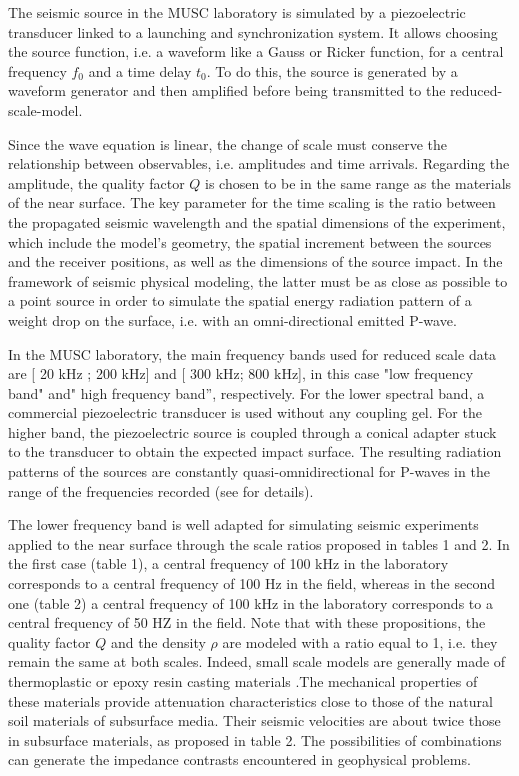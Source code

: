 \documentclass[manuscript,revised]{geophysics}
\begin{document}
\noindent The seismic source in the MUSC laboratory is simulated by a piezoelectric transducer linked to a launching and synchronization system. It allows choosing the source function, i.e. a waveform like a Gauss or Ricker function, for a central frequency $f_{0}$ and a time delay $t_{0}$. To do this, the source is generated by a waveform generator and then amplified before being transmitted to the reduced-scale-model.

\noindent Since the wave equation is linear, the change of scale must conserve the relationship between observables, i.e. amplitudes and time arrivals. Regarding the amplitude, the quality factor $Q$ is chosen to be in the same range as the materials of the near surface. The key parameter for the time scaling is the ratio between the propagated seismic wavelength and the spatial dimensions of the experiment, which include the model’s geometry, the spatial increment between the sources and the receiver positions, as well as the dimensions of the source impact. In the framework of seismic physical modeling, the latter must be as close as possible to a point source in order to simulate the spatial energy radiation pattern of a weight drop on the surface, i.e. with an omni-directional emitted P-wave.

\noindent In the MUSC laboratory, the main frequency bands used for reduced scale data are [ 20 kHz ; 200 kHz] and [ 300 kHz; 800 kHz], in this case "low frequency band" and" high frequency band”, respectively. For the lower spectral band, a commercial piezoelectric transducer is used without any coupling gel. For the higher band, the piezoelectric source is coupled through a conical adapter stuck to the transducer to obtain the expected impact surface. The resulting radiation patterns of the sources are constantly quasi-omnidirectional for P-waves in the range of the frequencies recorded (see \citet{Bretaudeau_SSM_2011} for details).

\noindent The lower frequency band is well adapted for simulating seismic experiments applied to the near surface through the scale ratios proposed in tables 1 and 2. In the first case (table 1), a central frequency of 100 kHz in the laboratory corresponds to a central frequency of 100 Hz in the field, whereas in the second one (table 2) a central frequency of 100 kHz in the laboratory corresponds to a central frequency of 50 HZ in the field. Note that with these propositions, the quality factor $Q$ and the density $\rho$ are modeled with a ratio equal to 1, i.e. they remain the same at both scales. Indeed, small scale models are generally made of thermoplastic or epoxy resin casting materials \citep{Bretaudeau_FWI_2013}.The mechanical properties of these materials provide attenuation characteristics close to those of the natural soil materials of subsurface media. Their seismic velocities are about twice those in subsurface materials, as proposed in table 2. The possibilities of combinations can generate the impedance contrasts encountered in geophysical problems. 
\end{document}
